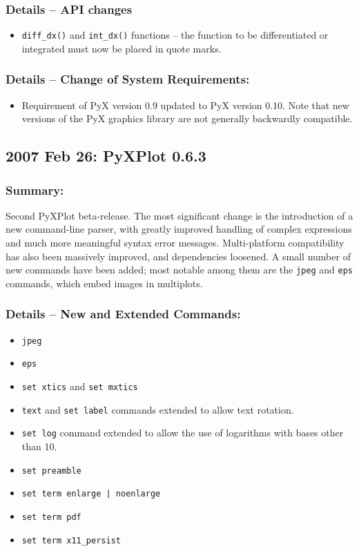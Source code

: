 \subsubsection*{Details -- API changes}

\begin{itemize}
\item {\tt diff\_dx()} and {\tt int\_dx()} functions -- the function to be
differentiated or integrated must now be placed in quote marks.
\end{itemize}

\subsubsection*{Details -- Change of System Requirements:}

\begin{itemize}
\item Requirement of PyX version 0.9 updated to PyX version 0.10. Note that new versions of the PyX graphics library are not generally backwardly compatible.
\end{itemize}

\subsection*{2007 Feb 26: PyXPlot 0.6.3}

\subsubsection*{Summary:}

Second PyXPlot beta-release. The most significant change is the introduction of
a new command-line parser, with greatly improved handling of complex
expressions and much more meaningful syntax error messages. Multi-platform
compatibility has also been massively improved, and dependencies loosened.  A
small number of new commands have been added; most notable among them are the
{\tt jpeg} and {\tt eps} commands, which embed images in multiplots.

\subsubsection*{Details -- New and Extended Commands:}

\begin{itemize}
\item {\tt jpeg}
\item {\tt eps}
\item {\tt set xtics} and {\tt set mxtics}
\item {\tt text} and {\tt set label} commands extended to allow text rotation.
\item {\tt set log} command extended to allow the use of logarithms with bases other than 10.
\item {\tt set preamble}
\item {\tt set term enlarge | noenlarge}
\item {\tt set term pdf}
\item {\tt set term x11\_persist}
\end{itemize}

